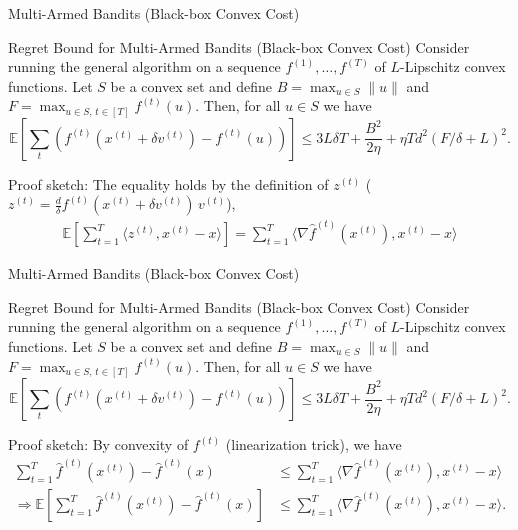 \begin{frame}{Multi-Armed Bandits (Black-box Convex Cost)}
\small
\begin{block}{Regret Bound for Multi-Armed Bandits (Black-box Convex Cost)}
    Consider running the general algorithm on a
    sequence $f^{(1)}, \ldots, f^{(T)}$ of $L$-Lipschitz convex functions. Let $S$ be a
    convex set and define $B = \max_{u \in S} \|u\|$ and
    $F = \max_{u \in S,\, t \in [T]} f^{(t)}(u)$. Then, for all $u \in S$ we have
    $$
    \mathbb{E}\left[\sum_t \left(f^{(t)}(x^{(t)} + \delta v^{(t)}) - f^{(t)}(u)\right)\right]
    \leq 3L\delta T + \frac{B^2}{2\eta} + \eta T d^2 (F/\delta + L)^2.
    $$
\end{block}
Proof sketch:
The equality holds by the definition of $z^{(t)}$ ($z^{(t)} = \frac{d}{\delta} f^{(t)}(x^{(t)} + \delta v^{(t)})\, v^{(t)}$),
\begin{align*}
\mathbb{E}\left[\sum_{t=1}^T \langle z^{(t)}, x^{(t)} - x \rangle \right] = \sum_{t=1}^T \langle \nabla \hat{f}^{(t)}(x^{(t)}), x^{(t)} - x \rangle 
\end{align*}
\end{frame}

\begin{frame}{Multi-Armed Bandits (Black-box Convex Cost)}
\small
\begin{block}{Regret Bound for Multi-Armed Bandits (Black-box Convex Cost)}
    Consider running the general algorithm on a
    sequence $f^{(1)}, \ldots, f^{(T)}$ of $L$-Lipschitz convex functions. Let $S$ be a
    convex set and define $B = \max_{u \in S} \|u\|$ and
    $F = \max_{u \in S,\, t \in [T]} f^{(t)}(u)$. Then, for all $u \in S$ we have
    $$
    \mathbb{E}\left[\sum_t \left(f^{(t)}(x^{(t)} + \delta v^{(t)}) - f^{(t)}(u)\right)\right]
    \leq 3L\delta T + \frac{B^2}{2\eta} + \eta T d^2 (F/\delta + L)^2.
    $$
\end{block}
Proof sketch:
By convexity of $f^{(t)}$ (linearization trick), we have
\begin{align*}
\sum_{t=1}^T \hat{f}^{(t)}(x^{(t)}) - \hat{f}^{(t)}(x) &\leq \sum_{t=1}^T \langle \nabla \hat{f}^{(t)}(x^{(t)}), x^{(t)} - x \rangle \\
\Rightarrow \mathbb{E} \left[\sum_{t=1}^T \hat{f}^{(t)}(x^{(t)}) - \hat{f}^{(t)}(x) \right] &\leq \sum_{t=1}^T \langle \nabla \hat{f}^{(t)}(x^{(t)}), x^{(t)} - x \rangle.
\end{align*}
\end{frame}

